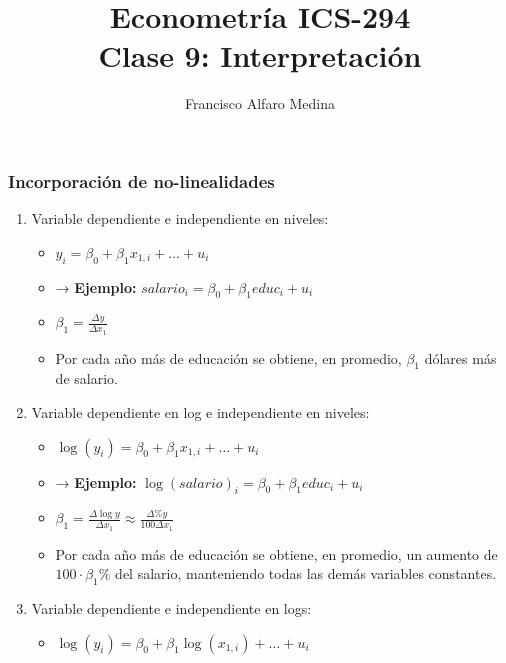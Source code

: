 \documentclass{beamer}
\title[ICS-162]{Econometría ICS-294\\ \small{Clase 9: Interpretaci\'on}}
\author{Francisco Alfaro Medina}
\institute[USM]
{Universidad Técnica Federico Santa María\\ %
	\medskip
	\textit{} %
	
}
\date{}
\begin{document}
	
\begin{frame}
	\titlepage %


\end{frame}
\logo{}

\begin{frame}[shrink=10]
\frametitle{Incorporación de no-linealidades}
    \begin{enumerate}
        \item {\color{blue}Variable dependiente e independiente en niveles:}
        \begin{itemize}
            \item[] \begin{center}$y_i = \beta_0 + \beta_1 x_{1,i} + \ldots + u_i$\end{center}
            \item → \textbf{Ejemplo:} $salario_i = \beta_0 + \beta_1 educ_i + u_i$
            \item $\beta_1 = \frac{\Delta y}{\Delta x_1}$
            \item Por cada año más de educación se obtiene, en promedio, $\beta_1$ dólares más de salario.
        \end{itemize}
        \item {\color{blue}Variable dependiente en log e independiente en niveles:}
        \begin{itemize}
            \item[] \begin{center} $\log(y_i) = \beta_0 + \beta_1 x_{1,i} + \ldots + u_i$\end{center}
            \item → \textbf{Ejemplo:} $\log(salario)_i = \beta_0 + \beta_1 educ_i + u_i$
            \item $\beta_1 = \frac{\Delta \log y}{\Delta x_1}\approx \frac{\Delta \% y}{100\Delta x_1}$
            \item Por cada año más de educación se obtiene, en promedio, un aumento de $100 \cdot \beta_1 \%$ del salario, manteniendo todas las demás variables constantes.
        \end{itemize}
        \item {\color{blue}Variable dependiente e independiente en logs:}
        \begin{itemize}
            \item[] \begin{center}$\log(y_i) = \beta_0 + \beta_1 \log(x_{1,i}) + \ldots + u_i$\end{center}

\end{itemize}
\end{enumerate}
\end{frame}
\end{document}

